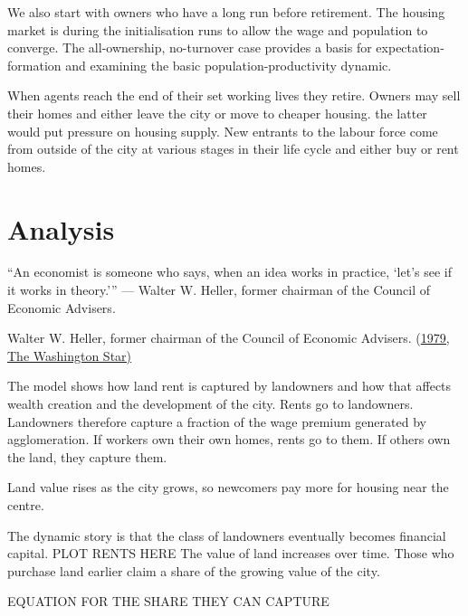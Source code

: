 We also start with owners who have a long run before retirement. The housing market is  during the initialisation runs to allow the wage and population to converge. The all-ownership, no-turnover case provides a basis for expectation-formation and examining the basic population-productivity dynamic. 

When agents reach the end of their set working lives they retire. %
Owners may sell their homes and either leave the city or move to cheaper housing. the latter would put pressure on housing supply. New entrants to the labour force come from outside of the city at various stages in their life cycle and either buy or rent homes. 

\chapter{Analysis} 
\epigraph{“An economist is someone who says, when an idea works in practice, ‘let’s see if it works in theory.'”
— Walter W. Heller, former chairman of the Council of Economic Advisers.}{ Walter W. Heller, former chairman of the Council of Economic Advisers. (\href{https://quoteinvestigator.com/2015/08/30/practice/}{1979, The Washington Star)}}


The model shows how land rent is captured by landowners and how that affects wealth creation and the development of the city. 
Rents go to landowners. %
Landowners therefore capture a fraction of the wage premium generated by agglomeration.
If workers own their own homes, rents go to them. If others own the land, they capture them.

Land value rises as the city grows, so newcomers pay more for housing near the centre.

The dynamic story is that the class of landowners eventually becomes financial capital.
PLOT RENTS HERE
The value of land increases over time. Those who purchase land earlier claim a share of the growing value of the city. %
 
EQUATION FOR THE SHARE THEY CAN CAPTURE

